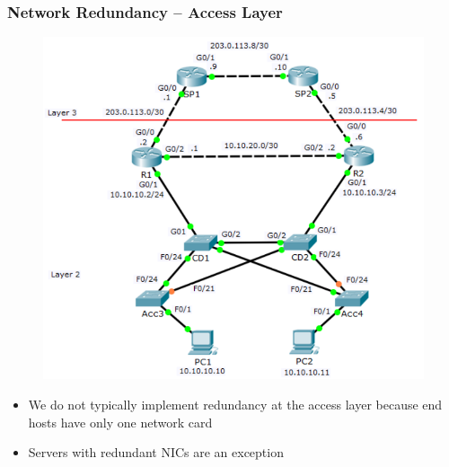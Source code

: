\documentclass[pdflatex,compress,mathserif]{beamer}
\begin{document}
\begin{frame}
	\frametitle{Network Redundancy – Access Layer}
	\begin{multicols}{2}
		\begin{figure}
			\centering
			\includegraphics[width=\linewidth]{img/img03}
		\end{figure}
		\columnbreak
		\begin{itemize}
			\item We do not typically implement
redundancy at the access layer
because end hosts have only one
network card
			\item Servers with redundant NICs are an
exception
		\end{itemize}
	\end{multicols}
\end{frame}
\end{document}
